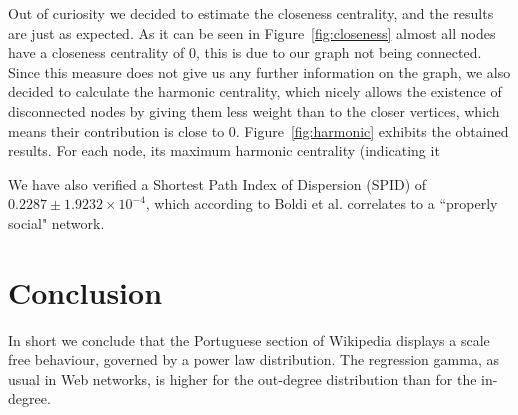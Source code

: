 \documentclass[9pt,a4paper,twocolumn]{article}
\begin{document}
Out of curiosity we decided to estimate the closeness centrality, and the results are just as expected. As it can be seen in Figure~\ref{fig:closeness} almost all nodes have a closeness centrality of 0, this is due to our graph not being connected. Since this measure does not give us any further information on the graph, we also decided to calculate the harmonic centrality, which nicely allows the existence of disconnected nodes by giving them less weight than to the closer vertices, which means their contribution is close to 0. Figure~\ref{fig:harmonic} exhibits the obtained results. For each node, its maximum harmonic centrality (indicating it

We have also verified a Shortest Path Index of Dispersion (SPID) of $0.2287 \pm 1.9232 \times 10^{-4}$, which according to Boldi et al. \cite{Boldi2011HyperANFAT} correlates to a ``properly social" network.

\section{Conclusion}

In short we conclude that the Portuguese section of Wikipedia displays a scale free behaviour, governed by a power law distribution. The regression gamma, as usual in Web networks, is higher for the out-degree distribution than for the in-degree.


\printglossary[type=\acronymtype]



\end{document}
